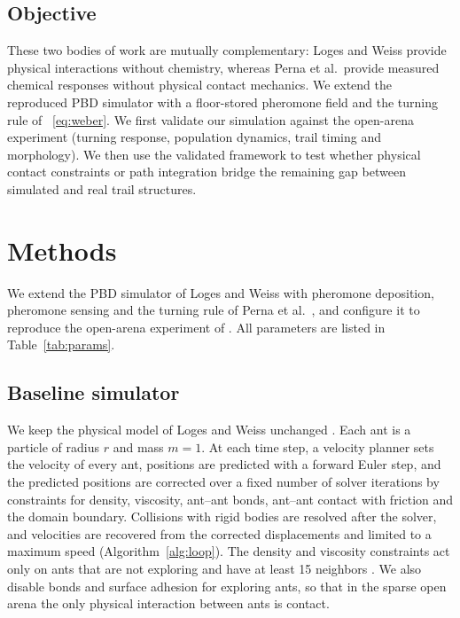 \documentclass[9pt,twoside]{pnas-new}
\begin{document}
\subsection{Objective}
These two bodies of work are mutually complementary: Loges and Weiss provide physical interactions without chemistry, whereas Perna et al.\ provide measured chemical responses without physical contact mechanics. We extend the reproduced PBD simulator with a floor-stored pheromone field and the turning rule of ~\eqref{eq:weber}. We first validate our simulation against the open-arena experiment (turning response, population dynamics, trail timing and morphology). We then use the validated framework to test whether physical contact constraints or path integration bridge the remaining gap between simulated and real trail structures.




\section{Methods}
We extend the PBD simulator of Loges and Weiss \cite{loges2025} with pheromone deposition, pheromone sensing and the turning rule of Perna et al.\ \cite{perna2012}, and configure it to reproduce the open-arena experiment of \cite{perna2012}. All parameters are listed in Table~\ref{tab:params}.

\subsection{Baseline simulator}
We keep the physical model of Loges and Weiss unchanged \cite{loges2025}. Each ant is a particle of radius $r$ and mass $m=1$. At each time step, a velocity planner sets the velocity of every ant, positions are predicted with a forward Euler step, and the predicted positions are corrected over a fixed number of solver iterations by constraints for density, viscosity, ant--ant bonds, ant--ant contact with friction and the domain boundary. Collisions with rigid bodies are resolved after the solver, and velocities are recovered from the corrected displacements and limited to a maximum speed (Algorithm~\ref{alg:loop}). The density and viscosity constraints act only on ants that are not exploring and have at least 15 neighbors \cite{loges2025}. We also disable bonds and surface adhesion for exploring ants, so that in the sparse open arena the only physical interaction between ants is contact.
\end{document}
